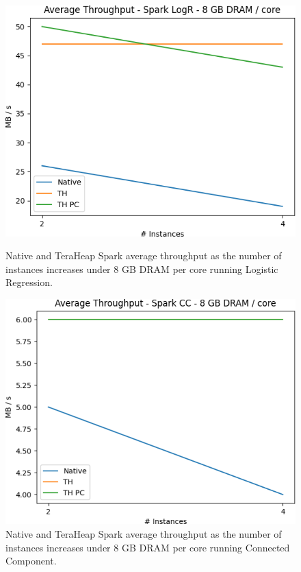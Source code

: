 \begin{figure}[thbp]
        \centering
        \includegraphics[width=\linewidth]{./fig/LOGR_64_THR.png}
    \caption{Native and TeraHeap Spark average throughput
        as the number of instances increases under 8 GB DRAM per core running Logistic Regression.}
                \label{fig:logr_64_thr}
        \includegraphics[width=\linewidth]{./fig/CC_64_THR.png}
    \caption{Native and TeraHeap Spark average throughput
        as the number of instances increases under 8 GB DRAM per core running Connected Component.}
                \label{fig:cc_64_thr}
\end{figure}

